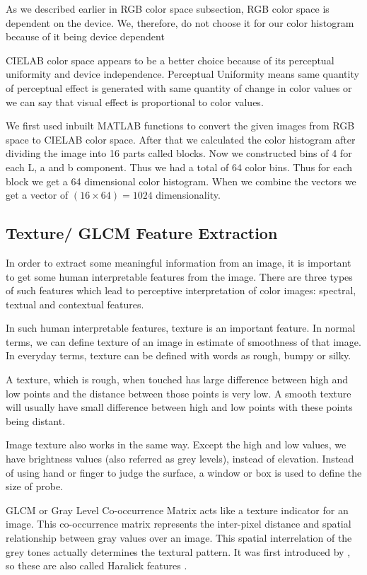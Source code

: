 As we described earlier in RGB color space subsection, RGB color space is dependent on the device.  We, therefore, do not choose it for our color histogram because of it being device dependent 

CIELAB color space appears to be a better choice because of its perceptual uniformity and device independence. Perceptual Uniformity means same quantity of perceptual effect is generated with same quantity of change in color values or we can say that visual effect is proportional to color values.

We first used inbuilt MATLAB functions to convert the given images from RGB space to CIELAB color space. After that we calculated the color histogram after dividing the image into 16 parts called blocks. Now we constructed bins of 4 for each L,  a and b component. Thus we had a total of 64 color bins. Thus for each block we get a 64 dimensional color histogram. When we combine the vectors we get a 
vector of $(16 \times 64 ) =1024$ dimensionality.
   
\subsection{Texture/ GLCM Feature Extraction}
In order to extract some meaningful information from an image, it is important to get some human interpretable features from the image. There are three types of such features which lead to perceptive interpretation of color images: spectral, textual and contextual features.

In such human interpretable features, texture is an important feature. In normal terms, we can define texture of an image in estimate of smoothness of that image. In everyday terms, texture can be defined with words as rough, bumpy or silky.

A texture, which is rough, when touched has large difference between high and low points and the distance between those points is very 
low. A smooth texture will usually have small difference between high and low points with these points being distant.

Image texture also works in the same way. Except the high and low values, we have brightness values (also referred as grey levels), instead of elevation. Instead of using hand or finger to judge the surface, a window or box is used to define the size of probe.

GLCM or Gray Level Co-occurrence Matrix acts like a texture indicator for an image. This co-occurrence matrix represents the inter-pixel distance and spatial relationship between gray values over an image. This spatial interrelation of the grey tones actually determines the textural pattern. It was first introduced by \citet*{haralick}, so these are also called Haralick features . 

